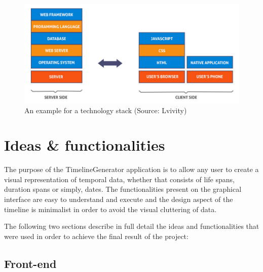 \documentclass{report}
\begin{document}
\begin{figure}[h]
\vspace*{3cm}
\centerline{\includegraphics[scale=0.4]{stack}}
\caption{An example for a technology stack (Source: Lvivity)}
\end{figure}
\newpage

\chapter {Ideas \& functionalities}

The purpose of the TimelineGenerator application is to allow any user to create a visual representation of temporal data, whether that consists of life spans, duration spans or simply, dates. The functionalities present on the graphical interface are easy to understand and execute and the design aspect of the timeline is minimalist in order to avoid the visual cluttering of data.\par

The following two sections describe in full detail the ideas and functionalities that were used in order to achieve the final result of the project:

\section {Front-end}
\end{document}
